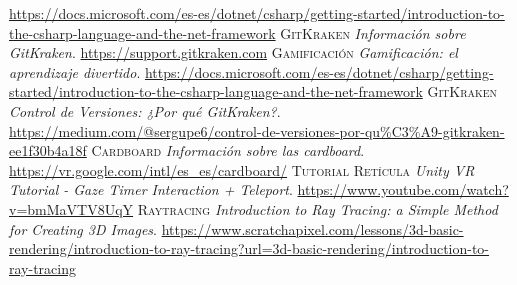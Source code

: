 \begin{thebibliography}{99}
			\url{https://docs.microsoft.com/es-es/dotnet/csharp/getting-started/introduction-to-the-csharp-language-and-the-net-framework}
			\textsc{GitKraken}
			\textit{Información sobre GitKraken}.
			\newline
			\url{https://support.gitkraken.com}
			\textsc{Gamificación}
			\textit{Gamificación: el aprendizaje divertido}.
			\newline
			\url{https://docs.microsoft.com/es-es/dotnet/csharp/getting-started/introduction-to-the-csharp-language-and-the-net-framework}
			\textsc{GitKraken}
			\textit{Control de Versiones: ¿Por qué GitKraken?}.
			\newline
			\url{https://medium.com/@sergupe6/control-de-versiones-por-qu%C3%A9-gitkraken-ee1f30b4a18f}
			\textsc{Cardboard}
			\textit{Información sobre las cardboard}.
			\newline
			\url{https://vr.google.com/intl/es_es/cardboard/}
			\textsc{Tutorial Retícula}
			\textit{Unity VR Tutorial - Gaze Timer Interaction + Teleport}.
			\newline
			\url{https://www.youtube.com/watch?v=bmMaVTV8UqY}
			\textsc{Raytracing}
			\textit{Introduction to Ray Tracing: a Simple Method for Creating 3D Images}.
			\newline
			\url{https://www.scratchapixel.com/lessons/3d-basic-rendering/introduction-to-ray-tracing?url=3d-basic-rendering/introduction-to-ray-tracing}


	\end{thebibliography}

	



	
